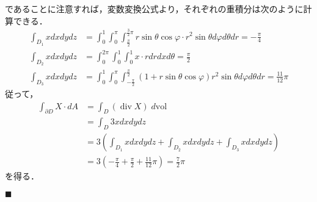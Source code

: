 \documentclass[dvipdfmx,a4paper,uplatex]{jsarticle}
\DeclareMathOperator{\Div}{\mathrm{div}}
\begin{document}
であることに注意すれば，変数変換公式より，それぞれの重積分は次のように計算できる．
\begin{align*}
    \int_{D_1}xdxdydz &= \int^1_0\int^\pi_0\int^{\frac{3}{2}\pi}_{\frac{\pi}{2}}r\sin\theta\cos\varphi\cdot r^2\sin\theta d\varphi d\theta dr =-\frac{\pi}{4} \\
    \int_{D_2}xdxdydz &= \int^{2\pi}_0\int^1_0\int^1_0 x\cdot rdrdxd\theta = \frac{\pi}{2} \\
    \int_{D_3}xdxdydz &= \int^1_0\int^\pi_0\int^{\frac{\pi}{2}}_{-\frac{\pi}{2}}(1+r\sin\theta\cos\varphi)r^2\sin\theta d\varphi d\theta dr = \frac{11}{12}\pi
\end{align*}
従って，
\begin{align*}
    \int_{\partial D}X\cdot dA &= \int_D (\Div X)\;d\mathrm{vol} \\
    &= \int_D 3x dxdydz\\
    &=3\left(\int_{D_1}xdxdydz + \int_{D_2}xdxdydz + \int_{D_3}xdxdydz\right)\\
    &=3\left(-\frac{\pi}{4}+\frac{\pi}{2}+\frac{11}{12}\pi\right)=\frac{7}{2}\pi
\end{align*}
を得る．
\begin{flushright}
    $\blacksquare$
\end{flushright}
\clearpage
\end{document}
